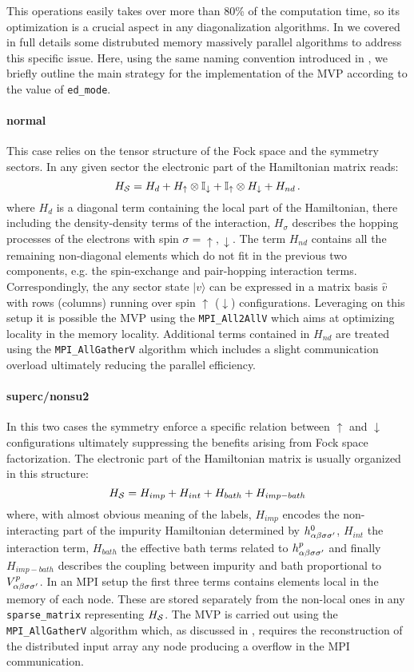 \documentclass[preprint,3p,10pt]{elsarticle}
\newcommand{\onlinecite}[1]{\nocite{#1}\hspace{-0.1cm}\citenum{#1}}
\newcommand{\ket}[1]
{|#1\rangle}
\def\a{\alpha}       \def\b{\beta}   \def\g{\gamma}   \def\d{\delta}
\def\up{\uparrow} \def\down{\downarrow} \def\dw{\downarrow}
\begin{document}
This operations easily takes over more than 80\% of the computation
time, so its optimization is a crucial aspect in any diagonalization
algorithms. In \onlinecite{amaricci2022} we covered in full details
some distrubuted memory massively parallel algorithms to address this
specific issue.
Here, using the same naming convention introduced in \cite{amaricci}, 
we briefly outline the main strategy for the implementation of the MVP
according to the value of {\tt ed\_mode}.


\paragraph{{\bf normal}}
This case relies on the tensor structure of the Fock space and the
symmetry sectors. In any given sector the electronic part of the
Hamiltonian matrix reads:
\begin{equation}
H_\SS = H_d  + H_\up\otimes \mathbb{I}_\dw + \mathbb{I}_\up\otimes
H_\dw + H_{nd}\,.
\label{HssNormal}
\end{equation}
where $H_d$ is a diagonal term containing the local part of the
Hamiltonian, there including the density-density terms of the
interaction,  $H_\sigma$ describes the hopping processes of the
electrons with spin $\sigma=\up,\dw$.
The term $H_{nd}$ contains all the remaining non-diagonal
elements which do not fit in the previous two components,
e.g. the spin-exchange and pair-hopping interaction terms.
Correspondingly, the any sector state $\ket{v}$ can be expressed in a matrix
basis $\hat{v}$ with rows (columns) running over spin $\up$ ($\down$)
configurations. Leveraging on this setup it is possible the MVP using the 
{\tt MPI\_All2AllV} which aims at optimizing locality in the memory
locality. Additional terms contained in $H_{nd}$ are treated using the
{\tt MPI\_AllGatherV} algorithm which includes a slight communication
overload ultimately reducing the parallel efficiency.  


\paragraph{{\bf superc/nonsu2}}
In this two cases the symmetry enforce a specific relation between $\up$ and
$\dw$ configurations ultimately suppressing the benefits arising from
Fock space factorization.
The electronic part of the Hamiltonian matrix is usually organized in this structure:
$$
H_{\cal S} = H_{imp} + H_{int} + H_{bath} + H_{imp-bath} 
$$
where, with almost obvious meaning of the labels, $H_{imp}$ encodes
the non-interacting part of the impurity Hamiltonian determined by
$h^0_{\a\b\s\s'}$, $H_{int}$ the interaction term, $H_{bath}$ the
effective bath terms related to $h^p_{\a\b\s\s'}$ and finally
$H_{imp-bath}$ describes the coupling between impurity and bath
proportional to $V^p_{\a\b\s\s'}$. 
In an MPI setup the first three terms contains elements local in the
memory of each node. These are stored separately from the non-local
ones in any {\tt sparse\_matrix} representing $H_{\cal S}$. 
The MVP is carried out using the {\tt MPI\_AllGatherV} algorithm
which, as discussed in \onlinecite{amaricci2022}, requires the
reconstruction of the distributed input array any node producing a
overflow in the MPI communication.  
\end{document}
